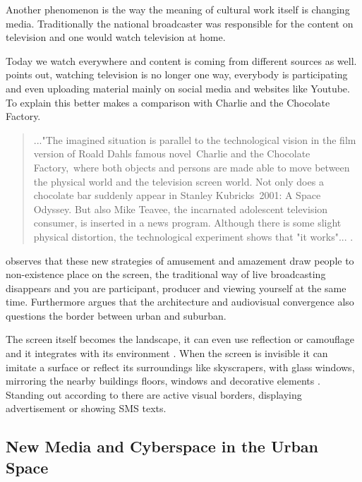 \documentclass[a4paper, 11pt]{article}
\begin{document}
Another phenomenon is the way the meaning of cultural work itself is changing media. Traditionally the national broadcaster was responsible for the content on television and one would watch television at home. 

Today we watch everywhere and content is coming from different sources as well. \cite{shirky2010} points out, watching television is no longer one way, everybody is participating and even uploading material mainly on social media and websites like Youtube.
To explain this better \cite{Slaatta2006} makes a comparison with Charlie and the Chocolate Factory. 

\begin{quote}
..."The imagined situation is parallel to the technological vision in the film version of Roald Dahls famous novel Charlie and the Chocolate Factory, where both objects and persons are made able to move between the physical world and the television screen world. Not only does a chocolate bar suddenly appear in Stanley Kubricks 2001: A Space Odyssey. But also Mike Teavee, the incarnated adolescent television consumer, is inserted in a news program. Although there is some slight physical distortion, the technological experiment shows that "it works"... 
\citep[P.1]{Slaatta2006}.
\end{quote} 


\cite{Slaatta2006} observes that these new strategies of amusement and amazement draw people to non-existence place on the screen, the traditional way of live broadcasting disappears and you are participant, producer and viewing yourself at the same time. Furthermore \cite{Slaatta2006} argues that the architecture and audiovisual convergence also questions the border between urban and suburban.

The screen itself becomes the landscape, it can even use reflection or camouflage and it integrates with its environment \cite{Slaatta2006}. When the screen is invisible it can imitate a surface or reflect its surroundings like skyscrapers, with glass windows, mirroring the nearby buildings floors, windows and decorative elements \citep{Slaatta2006}. Standing out according to \cite{Slaatta2006} there are active visual borders, displaying advertisement or showing SMS texts.

\subsection{New Media and Cyberspace in the Urban Space}
\end{document}
